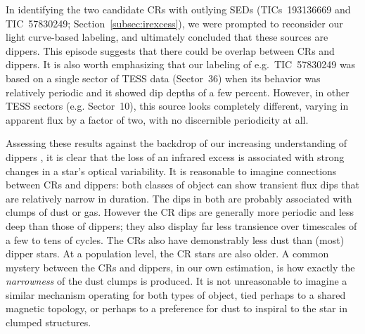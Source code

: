 \documentclass[11pt,twocolumn,tighten]{aastex63}
\begin{document}
In identifying the two candidate CRs with outlying SEDs
(TICs~193136669 and TIC~57830249; Section~\ref{subsec:irexcess}), we
were prompted to reconsider our light curve-based labeling, and
ultimately concluded that these sources are dippers.  This episode
suggests that there could be overlap between CRs and dippers.  It is
also worth emphasizing that our labeling of e.g.~TIC~57830249 was
based on a single sector of TESS data (Sector~36) when its behavior
was relatively periodic and it showed dip depths of a few percent.
However, in other TESS sectors (e.g. Sector~10), this source looks
completely different, varying in apparent flux by a factor of two,
with no discernible periodicity at all.

Assessing these results against the backdrop of our increasing
understanding of dippers
\citep[e.g.][]{2014AJ....147...82C,2016ApJ...816...69A,2021ApJ...908...16R,2022ApJS..263...14C,2022MNRAS.514.1386G},
it is clear that the loss of an infrared excess is associated with
strong changes in a star's optical variability.  It is reasonable to
imagine connections between CRs and dippers: both classes of object
can show transient flux dips that are relatively narrow in duration.
The dips in both are probably associated with clumps of dust or gas.
However the CR dips are generally more periodic and less deep than
those of dippers; they also display far less transience over
timescales of a few to tens of cycles.  The CRs also have
demonstrably less dust than (most) dipper stars.  At a population
level, the CR stars are also older.  A common mystery between the
CRs and dippers, in our own estimation, is how exactly the {\it
narrowness} of the dust clumps is produced.  It is not unreasonable to
imagine a similar mechanism operating for both types of object, tied
perhaps to a shared magnetic topology, or perhaps to a preference for
dust to inspiral to the star in clumped structures.
\end{document}
